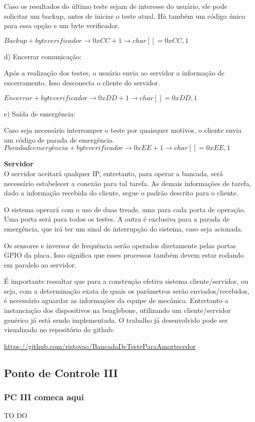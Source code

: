 	Caso os resultados do último teste sejam de interesse do usuário, ele pode solicitar um backup, antes de iniciar o teste atual. Há também um código único para essa opção e um byte verificador.

		\textit{$Backup + byte verificador \rightarrow 0xCC + 1 \rightarrow char[] = {0xCC, 1}$}
		
	d) Encerrar comunicação:

	Após a realização dos testes, o usuário envia ao servidor a informação de encerramento. Isso desconecta o cliente do servidor.

		\textit{$Encerrar + byte verificador \rightarrow 0xDD + 1 \rightarrow char[] = {0xDD, 1}$}
		
	e) Saída de emergência:

	Caso seja necessário interromper o teste por quaisquer motivos, o cliente envia um código de parada de emergência.
		\textit{$Parada de emergência + byte verificador \rightarrow 0xEE + 1 \rightarrow char[] = {0xEE, 1}$}

	\textbf {Servidor}\\
	O servidor aceitará qualquer IP, entretanto, para operar a bancada, será necessário estabelecer a conexão para tal tarefa. As demais informações de tarefa, dado a informação recebida do cliente, segue o padrão descrito para o cliente.

	O sistema operará com o uso de duas treads, uma para cada porta de operação. Uma porta será para todos os testes. A outra é exclusiva para a parada de emergência, que irá ter um sinal de interrupção do sistema, caso seja acionada.

	Os sensores e inversor de frequência serão operados diretamente pelas portas GPIO da placa. Isso significa que esses processos também devem estar rodando em paralelo ao servidor.

	É importante ressaltar que para a construção efetiva sistema cliente/servidor, ou seja, com a determinação exata de quais os parâmetros serão enviados/recebidos, é necessário aguardar as informações da equipe de mecânica. Entretanto a instanciação dos dispositivos na beaglebone, utilizando um cliente/servidor genérico já está sendo implementada. O trabalho já desenvolvido pode ser visualizado no repositório do github:

	\href{https://github.com/ristovao/BancadaDeTesteParaAmortecedor}{https://github.com/ristovao/BancadaDeTesteParaAmortecedor}

\newpage
\subsection{Ponto de Controle III}
\subsubsection{PC III comeca aqui}
	
	TO DO